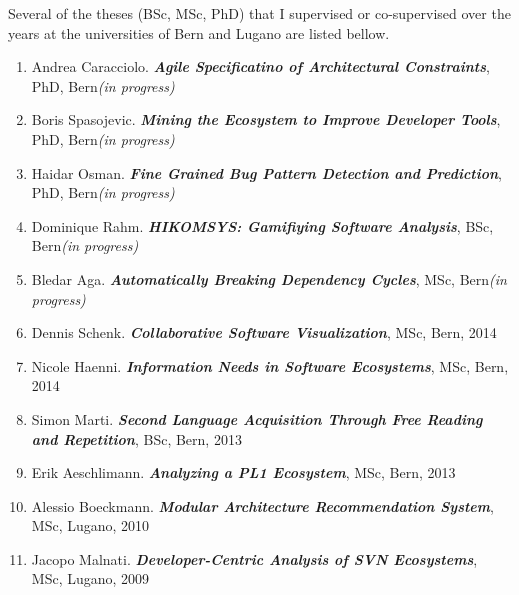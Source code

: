 
\newcommand{\super}[5]{\item #1. \emph{\bf #2}, #3, #4#5}
\newcommand{\inprogr}{\emph{(in progress)}}
\newcommand{\yr}[1]{, #1}

Several of the theses (BSc, MSc, PhD) that I supervised or co-supervised over the years at the universities of Bern and Lugano are listed bellow. 

\begin{enumerate}

\super 
	{Andrea Caracciolo}
	{Agile Specificatino of Architectural Constraints}
	{PhD}
	{Bern}
	{\inprogr}

\super 
	{Boris Spasojevic}
	{Mining the Ecosystem to Improve Developer Tools}
	{PhD}
	{Bern}
	{\inprogr}

\super 
	{Haidar Osman}
	{Fine Grained Bug Pattern Detection and Prediction}
	{PhD}
	{Bern}
	{\inprogr}	


\super 
	{Dominique Rahm}
	{HIKOMSYS: Gamifiying Software Analysis}
	{BSc}
	{Bern}
	{\inprogr}

\super 
	{Bledar Aga}
	{Automatically Breaking Dependency Cycles}
	{MSc}
	{Bern}
	{\inprogr}

\super 
	{Dennis Schenk}
	{Collaborative Software Visualization}
	{MSc}
	{Bern}
	{\yr{2014}}

\super 
	{Nicole Haenni}
	{Information Needs in Software Ecosystems}
	{MSc}
	{Bern}
	{\yr{2014}}

\super 
	{Simon Marti}
	{Second Language Acquisition Through Free Reading and Repetition}
	{BSc}
	{Bern}
	{\yr{2013}}

\super 
	{Erik Aeschlimann}
	{Analyzing a PL1 Ecosystem}
	{MSc}
	{Bern}
	{\yr{2013}}


\super 
	{Alessio Boeckmann}
	{Modular Architecture Recommendation System}
	{MSc}
	{Lugano}
	{\yr{2010}}

\super 
	{Jacopo Malnati}
	{Developer-Centric Analysis of SVN Ecosystems}
	{MSc}
	{Lugano}
	{\yr{2009}}



\end{enumerate}